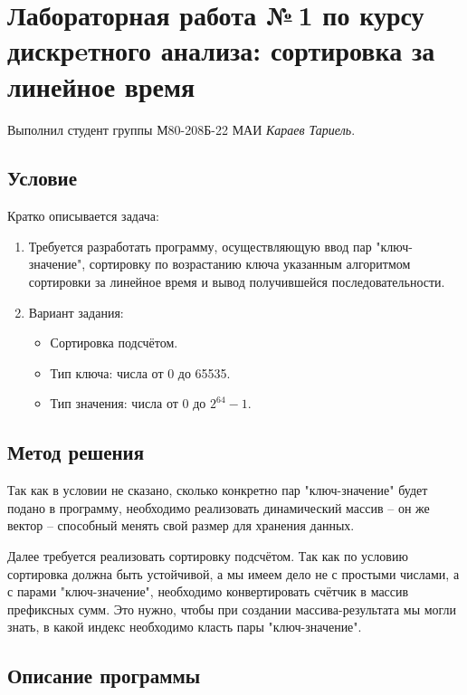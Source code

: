 \documentclass[12pt]{article}
\begin{document}
\section*{Лабораторная работа №\,1 по курсу дискрeтного анализа: сортировка за линейное время}

Выполнил студент группы М80-208Б-22 МАИ \textit{Караев Тариель}.

\subsection*{Условие}

Кратко описывается задача:
\begin{enumerate}
\item
    Требуется разработать программу, осуществляющую ввод пар "ключ-значение", сортировку по возрастанию ключа указанным алгоритмом сортировки за линейное время и вывод получившейся последовательности.
\item
    Вариант задания:
        \begin{itemize}
            \item Сортировка подсчётом.
            \item Тип ключа: числа от 0 до 65535.
            \item Тип значения: числа от 0 до $2^{64} - 1$.
        \end{itemize}
\end{enumerate}

\subsection*{Метод решения}

Так как в условии не сказано, сколько конкретно пар "ключ-значение" будет подано в программу, необходимо реализовать динамический массив -- он же вектор -- способный менять свой размер для хранения данных.
\par Далее требуется реализовать сортировку подсчётом. Так как по условию сортировка должна быть устойчивой, а мы имеем дело не с простыми числами, а с парами "ключ-значение", необходимо конвертировать счётчик в массив префиксных сумм. Это нужно, чтобы при создании массива-результата мы могли знать, в какой индекс необходимо класть пары "ключ-значение".

\subsection*{Описание программы}
\end{document}
